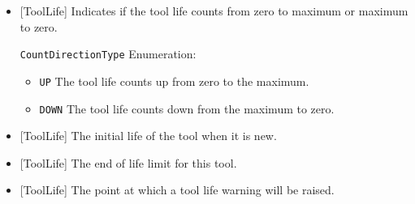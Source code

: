 \begin{itemize}

\item {}[ToolLife] \newline Indicates if the tool life counts from zero to maximum or maximum to zero.

\texttt{CountDirectionType} Enumeration:

\begin{itemize}
\item \texttt{UP} \newline The tool life counts up from zero to the maximum.
 
\item \texttt{DOWN} \newline The tool life counts down from the maximum to zero. 
\end{itemize}


\item {}[ToolLife] \newline The initial life of the tool when it is new.

\item {}[ToolLife] \newline The end of life limit for this tool.

\item {}[ToolLife] \newline The point at which a tool life warning will be raised.
\end{itemize}
